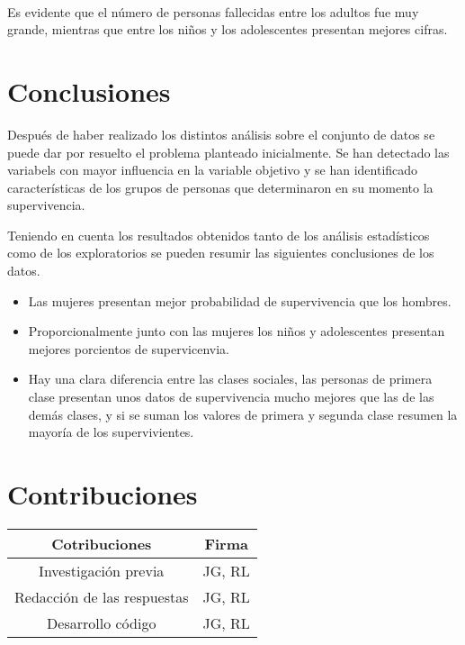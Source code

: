 \documentclass[11pt]{article}
\providecommand{\tightlist}{%
      \setlength{\itemsep}{0pt}\setlength{\parskip}{0pt}}
\begin{document}
    \begin{center}
    \end{center}
    { \hspace*{\fill} \\}
    
    Es evidente que el número de personas fallecidas entre los adultos fue
muy grande, mientras que entre los niños y los adolescentes presentan
mejores cifras.

    \hypertarget{conclusiones}{%
\section{Conclusiones}\label{conclusiones}}

Después de haber realizado los distintos análisis sobre el conjunto de
datos se puede dar por resuelto el problema planteado inicialmente. Se
han detectado las variabels con mayor influencia en la variable objetivo
y se han identificado características de los grupos de personas que
determinaron en su momento la supervivencia.

Teniendo en cuenta los resultados obtenidos tanto de los análisis
estadísticos como de los exploratorios se pueden resumir las siguientes
conclusiones de los datos.

\begin{itemize}
\tightlist
\item
  Las mujeres presentan mejor probabilidad de supervivencia que los
  hombres.
\item
  Proporcionalmente junto con las mujeres los niños y adolescentes
  presentan mejores porcientos de supervicenvia.
\item
  Hay una clara diferencia entre las clases sociales, las personas de
  primera clase presentan unos datos de supervivencia mucho mejores que
  las de las demás clases, y si se suman los valores de primera y
  segunda clase resumen la mayoría de los supervivientes.
\end{itemize}

    \hypertarget{contribuciones}{%
\section{Contribuciones}\label{contribuciones}}

\begin{longtable}[]{@{}cc@{}}
\toprule
Cotribuciones & Firma\tabularnewline
\midrule
\endhead
Investigación previa & JG, RL\tabularnewline
Redacción de las respuestas & JG, RL\tabularnewline
Desarrollo código & JG, RL\tabularnewline
\bottomrule
\end{longtable}


    
    
    
\end{document}
